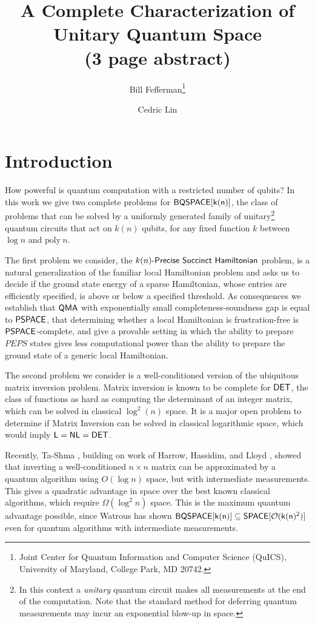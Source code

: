 \documentclass[11pt]{article}
\title{A Complete Characterization of Unitary Quantum Space \\ {\small \bf (3 page abstract)}}
\author{Bill Fefferman\thanks{Joint Center for Quantum Information and Computer Science (QuICS), University of Maryland,
College Park, MD 20742.}
\and {Cedric Lin\samethanks}}
\date{}
\numberwithin{lemma}{section}
\theoremstyle{definition}
\newcommand\BQSPACE{\sf{BQSPACE}}
\newcommand\PSPACE{\sf{PSPACE}}
\newcommand\DET{{\sf{DET}}}
\newcommand\Logspace{{\sf{L}}}
\newcommand\DSPACE{{\sf{SPACE}}}
\newcommand\NL{{\sf{NL}}}
\newcommand\QMA{{\sf{QMA}}}
\newcommand\bigoh{\mathcal{O}}
\newcommand{\polyn}{\mathrm{poly\:}}
\newcommand\psham[1]{#1\textit{\sf{-Precise Succinct Hamiltonian}}}
\begin{document}
\vspace{-2.0in}
\maketitle
\setcounter{page}{0}
\thispagestyle{empty}
\pagestyle{empty}
\vspace{-.6in}
\section{Introduction}
How powerful is quantum computation with a restricted number of qubits? In this work we give two complete problems for $\BQSPACE[k(n)]$, the class of problems that can be solved by a uniformly generated family of unitary\footnote{In this context a {\emph{unitary}} quantum circuit makes all measurements at the end of the computation.  Note that the standard method for deferring quantum measurements may incur an exponential blow-up in space.} quantum circuits that act on $k(n)$ qubits, for any fixed function $k$ between $\log{n}$ and $\polyn{n}$.

The first problem we consider, the $\psham{k(n)}$ problem, is a natural generalization of the familiar local Hamiltonian problem and asks us to decide if the ground state energy of a sparse Hamiltonian, whose entries are efficiently specified, is above or below a specified threshold.  As consequences we establish that $\QMA$ with exponentially small completeness-soundness gap is equal to $\PSPACE$, that determining whether a local Hamiltonian is frustration-free is $\PSPACE$-complete, and give a provable setting in which the ability to prepare $PEPS$ states gives less computational power than the ability to prepare the ground state of a generic local Hamiltonian.

The second problem we consider is a well-conditioned version of the ubiquitous matrix inversion problem.  Matrix inversion is known to be complete for $\DET$, the class of functions as hard as computing the determinant of an integer matrix, which can be solved in classical $\log^{2}(n)$ space. It is a major open problem to determine if Matrix Inversion can be solved in classical logarithmic space, which would imply $\Logspace=\NL=\DET$.  

Recently, Ta-Shma \cite{tashma}, building on work of Harrow, Hassidim, and Lloyd \cite{HHL}, showed that inverting a well-conditioned $n \times n$ matrix can be approximated by a quantum algorithm using $O(\log n)$ space, but with intermediate measurements. This gives a quadratic advantage in space over the best known classical algorithms, which require $\Omega(\log^2n)$ space.  This is the maximum quantum advantage possible, since Watrous has shown $\BQSPACE[k(n)]\subseteq\DSPACE[\bigoh(k(n)^2)]$ \cite{Watrous99,Watrous03} even for quantum algorithms with intermediate measurements. 
 
\end{document}
